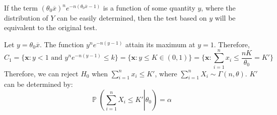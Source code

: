 \documentclass{huhtakm-template-book-v2}
\DeclareMathOperator{\prob}{\mathbb{P}}
\begin{document}
\begin{eg}
	If the term $(\theta_{0}\overline{x})^{n}e^{-n(\theta_{0}\overline{x}-1)}$ is a function of some quantity $y$, where the distribution of $Y$ can be easily determined, then the test based on $y$ will be equivalent to the original test.
	
	Let $y=\theta_{0}\overline{x}$. The function $y^{n}e^{-n(y-1)}$ attain its maximum at $y=1$. Therefore,
	\begin{equation*}
		C_{1}=\bigl\{\mathbf{x}:y<1\text{ and }y^{n}e^{-n(y-1)}\leq k\bigr\}=\{\mathbf{x}:y\leq K\in(0,1)\}=\biggl\{\mathbf{x}:\sum_{i=1}^{n}x_{i}\leq\frac{nK}{\theta_{0}}=K'\biggr\}
	\end{equation*}
	Therefore, we can reject $H_{0}$ when $\sum_{i=1}^{n}x_{i}\leq K'$, where $\sum_{i=1}^{n}X_{i}\sim\Gamma(n,\theta)$. $K'$ can be determined by:
	\begin{equation*}
		\prob\left(\left.\sum_{i=1}^{n}X_{i}\leq K'\right|\theta_{0}\right)=\alpha
	\end{equation*}
\end{eg}
\end{document}
